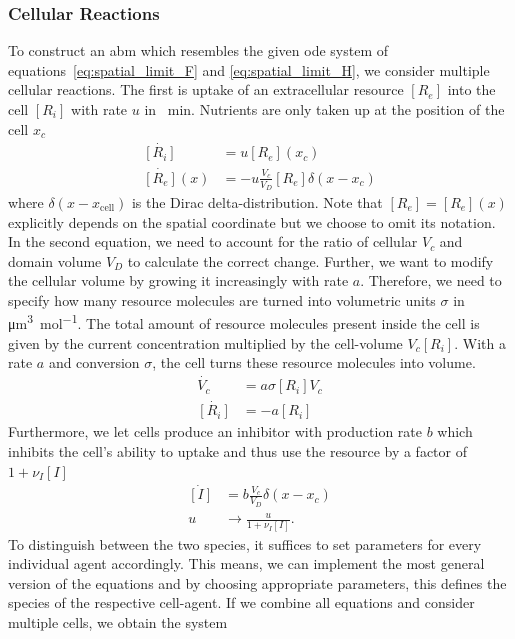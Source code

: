 \documentclass[10pt,twocolumn,5p]{elsarticle}
\numberwithin{equation}{section}
\begin{document}
\subsubsection{Cellular Reactions}
To construct an \ac{abm} which resembles the given \ac{ode} system of equations~\eqref{eq:spatial_limit_F} and \eqref{eq:spatial_limit_H}, we consider multiple cellular reactions.
The first is uptake of an extracellular resource $[R_e]$ into the cell $[R_i]$ with rate $u$ in \unit{\per\minute}.
Nutrients are only taken up at the position of the cell $x_c$
\begin{align}
    \dot{[R_i]} &= u [R_e](x_c)\\
    \dot{[R_e]}(x) &= -u \frac{V_c}{V_D} [R_e] \delta(x-x_c)
\end{align}
where $\delta(x-x_\text{cell})$ is the Dirac delta-distribution.
Note that $[R_e]=[R_e](x)$ explicitly depends on the spatial coordinate but we choose to omit its notation.
In the second equation, we need to account for the ratio of cellular $V_c$ and domain volume $V_D$ to calculate the correct change.
Further, we want to modify the cellular volume by growing it increasingly with rate $a$.
Therefore, we need to specify how many resource molecules are turned into volumetric units $\sigma$ in \unit{\micro\metre\cubed\per\mole}.
The total amount of resource molecules present inside the cell is given by the current concentration multiplied by the cell-volume $V_c [R_i]$.
With a rate $a$ and conversion $\sigma$, the cell turns these resource molecules into volume.
\begin{align}
    \dot{V_c} &= a\sigma [R_i] V_c\\
    \dot{[R_i]} &= - a[R_i]
\end{align}
Furthermore, we let cells produce an inhibitor with production rate $b$ which inhibits the cell's ability to uptake and thus use the resource by a factor of $1+\nu_I [I]$
\begin{align}
    \dot{[I]} &= b\frac{V_c}{V_D}\delta(x-x_c)\\
    u &\longrightarrow \frac{u}{1+\nu_I [I]}.
\end{align}
To distinguish between the two species, it suffices to set parameters for every individual agent accordingly.
This means, we can implement the most general version of the equations and by choosing appropriate parameters, this defines the species of the respective cell-agent.
If we combine all equations and consider multiple cells, we obtain the system
\end{document}
